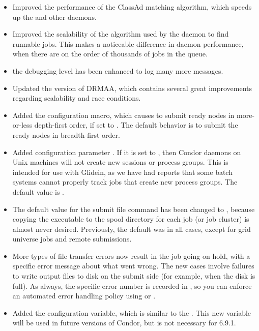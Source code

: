 \begin{itemize}

\item Improved the performance of the ClassAd matching algorithm,
which speeds up the  and other daemons.

\item Improved the scalability of the algorithm used by 
the  daemon to find runnable jobs.
This makes a noticeable difference in  daemon performance,
when there are on the order of thousands of jobs in the queue.

\item the  debugging level has been enhanced to
log many more messages. 

\item Updated the version of DRMAA, which contains several great
improvements regarding scalability and race conditions.

\item Added the  configuration macro,
which causes  to submit ready nodes in more-or-less depth-first
order, if set to .  The default behavior is to submit
the ready nodes in breadth-first order.

\item Added configuration parameter .
If it is set to ,
then Condor daemons on Unix machines will not create new 
sessions or process groups. This is intended for use with Glidein, as
we have had reports that some batch systems cannot properly track jobs that
create new process groups. The default value is .

\item The default value for the submit file command
 has been changed to , because copying
the executable to the spool directory for each job (or job cluster) is almost
never desired.  Previously, the default was  in all
cases, except for grid universe jobs and remote submissions.

\item More types of file transfer errors now result in the job going
on hold, with a specific error message about what went wrong.  The new
cases involve failures to write output files to disk on the submit
side (for example, when the disk is full).
As always, the specific error number is
recorded in , so you can enforce an automated
error handling policy using  or
.

\item Added the 
configuration variable, which is similar to the 
.
This new variable will be used in future versions of Condor, but is
not necessary for 6.9.1.


\end{itemize}

